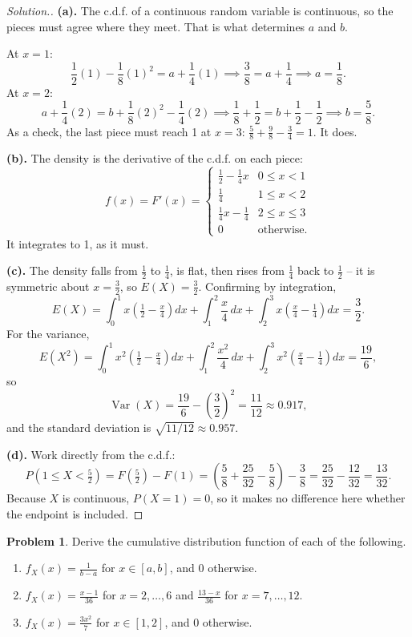 \documentclass[12pt,a4paper]{report}
\theoremstyle{definition}
\theoremstyle{plain}
\theoremstyle{definition}
\newtheorem{problemx}{Problem}[section]
\newenvironment{problem}{\begin{problemx}}{\end{problemx}}
\newenvironment{solution}
  {\renewcommand{\qedsymbol}{}\begin{proof}[\textit{Solution}.]}
  {\end{proof}}
\begin{document}
\begin{solution}
\textbf{(a).} The c.d.f. of a continuous random variable is continuous, so the pieces
must agree where they meet. That is what determines $a$ and $b$.

At $x=1$:
\[\frac{1}{2}(1)-\frac{1}{8}(1)^2 = a+\frac{1}{4}(1)
 \implies \frac{3}{8} = a+\frac{1}{4} \implies a = \frac{1}{8}.\]
At $x=2$:
\[a+\frac{1}{4}(2) = b+\frac{1}{8}(2)^2-\frac{1}{4}(2)
 \implies \frac{1}{8}+\frac{1}{2} = b+\frac{1}{2}-\frac{1}{2} \implies b = \frac{5}{8}.\]
As a check, the last piece must reach 1 at $x=3$:
$\tfrac58+\tfrac98-\tfrac34 = 1$. It does.

\textbf{(b).} The density is the derivative of the c.d.f. on each piece:
\[f(x) = F'(x) = \begin{cases}
\frac{1}{2}-\frac{1}{4}x & 0\leq x<1\\[6pt]
\frac{1}{4} & 1\leq x<2\\[6pt]
\frac{1}{4}x-\frac{1}{4} & 2\leq x\leq 3\\[6pt]
0 & \text{otherwise.}
\end{cases}\]
It integrates to 1, as it must.

\textbf{(c).} The density falls from $\tfrac12$ to $\tfrac14$, is flat, then rises from
$\tfrac14$ back to $\tfrac12$ -- it is symmetric about $x = \tfrac32$, so
$E(X) = \tfrac32$. Confirming by integration,
\[E(X) = \int_0^1 x\left(\tfrac12-\tfrac{x}{4}\right)dx + \int_1^2 \frac{x}{4}\,dx
 + \int_2^3 x\left(\tfrac{x}{4}-\tfrac14\right)dx = \frac{3}{2}.\]
For the variance,
\[E(X^2) = \int_0^1 x^2\left(\tfrac12-\tfrac{x}{4}\right)dx + \int_1^2 \frac{x^2}{4}\,dx
 + \int_2^3 x^2\left(\tfrac{x}{4}-\tfrac14\right)dx = \frac{19}{6},\]
so
\[\operatorname{Var}(X) = \frac{19}{6}-\left(\frac{3}{2}\right)^{2} = \frac{11}{12}
 \approx 0.917,\]
and the standard deviation is $\sqrt{11/12}\approx 0.957$.

\textbf{(d).} Work directly from the c.d.f.:
\[P\left(1\leq X<\tfrac52\right) = F\left(\tfrac52\right)-F(1)
 = \left(\frac58+\frac{25}{32}-\frac58\right)-\frac38 = \frac{25}{32}-\frac{12}{32}
 = \frac{13}{32}.\]
Because $X$ is continuous, $P(X=1) = 0$, so it makes no difference here whether the
endpoint is included.
\end{solution}

\begin{problem}
Derive the cumulative distribution function of each of the following.
\begin{enumerate}
\item[(a).] $f_X(x) = \frac{1}{b-a}$ for $x\in[a,b]$, and $0$ otherwise.
\item[(b).] $f_X(x) = \frac{x-1}{36}$ for $x = 2,\ldots,6$ and
 $\frac{13-x}{36}$ for $x = 7,\ldots,12$.
\item[(c).] $f_X(x) = \frac{3x^{2}}{7}$ for $x\in[1,2]$, and $0$ otherwise.
\end{enumerate}
\end{problem}
\end{document}
